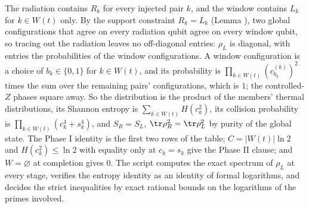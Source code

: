 The radiation contains $R_k$ for every injected pair $k$, and the window contains $L_k$ for $k \in W(t)$ only. By the support constraint $R_k = L_k$ (Lemma ), two global configurations that agree on every radiation qubit agree on every window qubit, so tracing out the radiation leaves no off-diagonal entries: $\rho_L$ is diagonal, with entries the probabilities of the window configurations. A window configuration is a choice of $b_k \in \{0, 1\}$ for $k \in W(t)$, and its probability is $\prod_{k \in W(t)}(c^{(k)}_{b_k})^{2}$ times the sum over the remaining pairs' configurations, which is $1$; the controlled-$Z$ phases square away. So the distribution is the product of the members' thermal distributions, its Shannon entropy is $\sum_{k \in W(t)}H(c_k^{2})$, its collision probability is $\prod_{k \in W(t)}(c_k^{4} + s_k^{4})$, and $S_R = S_L$, $\tr\rho_R^{2} = \tr\rho_L^{2}$ by purity of the global state. The Phase I identity is the first two rows of the table; $C = |W(t)|\ln 2$ and $H(c_k^{2}) \leq \ln 2$ with equality only at $c_k = s_k$ give the Phase II clause; and $W = \varnothing$ at completion gives $0$. The script computes the exact spectrum of $\rho_L$ at every stage, verifies the entropy identity as an identity of formal logarithms, and decides the strict inequalities by exact rational bounds on the logarithms of the primes involved.
